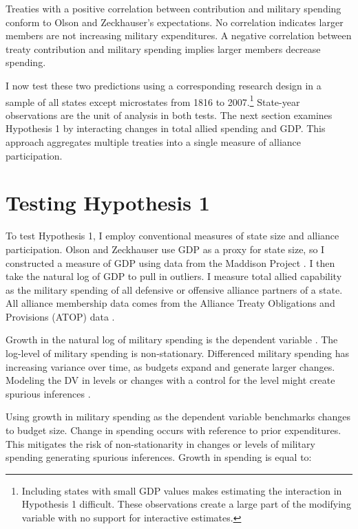 \documentclass[12pt]{article}
\begin{document}
Treaties with a positive correlation between contribution and military spending conform to Olson and Zeckhauser's expectations. 
No correlation indicates larger members are not increasing military expenditures.
A negative correlation between treaty contribution and military spending implies larger members decrease spending. 


I now test these two predictions using a corresponding research design in a sample of all states except microstates from 1816 to 2007.\footnote{Including states with small GDP values makes estimating the interaction in Hypothesis 1 difficult. These observations create a large part of the modifying variable with no support for interactive estimates.}
State-year observations are the unit of analysis in both tests. 
The next section examines Hypothesis 1 by interacting changes in total allied spending and GDP.
This approach aggregates multiple treaties into a single measure of alliance participation. 


\section{Testing Hypothesis 1}

To test Hypothesis 1, I employ conventional measures of state size and alliance participation. 
Olson and Zeckhauser use GDP as a proxy for state size, so I constructed a measure of GDP using data from the Maddison Project \citep{Boltetal2018}. 
I then take the natural log of GDP to pull in outliers. 
I measure total allied capability as the military spending of all defensive or offensive alliance partners of a state.
All alliance membership data comes from the Alliance Treaty Obligations and Provisions (ATOP) data \citep{Leedsetal2002}.  


Growth in the natural log of military spending is the dependent variable \citep{SingerCINC1988}. 
The log-level of military spending is non-stationary.
Differenced military spending has increasing variance over time, as budgets expand and generate larger changes. 
Modeling the DV in levels or changes with a control for the level might create spurious inferences \citep{GrangerNewbold1974}. 


Using growth in military spending as the dependent variable benchmarks changes to budget size. 
Change in spending occurs with reference to prior expenditures. 
This mitigates the risk of non-stationarity in changes or levels of military spending generating spurious inferences.
Growth in spending is equal to: 
\end{document}
